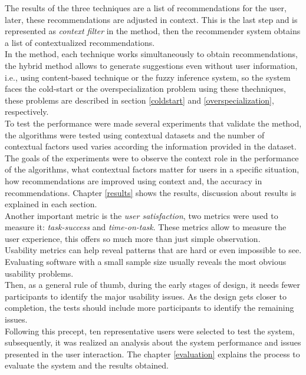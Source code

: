 The results of the three techniques are a list of recommendations for
the user, later, these recommendations are adjusted in context. This
is the last step and is represented as \textit{context filter} in the
method, then the recommender system obtains a list of contextualized
recommendations. \\
In the method, each technique works simultaneously to obtain
recommendations, the hybrid method allows to generate suggestions even
without user information, i.e., using content-based technique or the
fuzzy inference system, so the system faces the cold-start or the
overspecialization problem using these thechniques, these problems are
described in section \ref{coldstart} and 
\ref{overspecialization}, respectively.\\
To test the performance were made several experiments that validate
the method, the algorithms were tested using contextual datasets and
the number of contextual factors used varies according the information
provided in the dataset. The goals of the experiments were to observe
the context role in the performance of the algorithms, what contextual
factors matter for users in a specific situation, how recommendations
are improved using context and, the accuracy in recommendations.
Chapter \ref{results} shows the results, discussion about results is
explained in each section.\\
Another important metric is the \textit{user satisfaction}, two
metrics were used to measure it: \textit{task-success} and \textit
{time-on-task}. These metrics allow to measure the user experience,
this offers so much more than just simple observation.\\ Usability
metrics can help reveal patterns that are hard or even impossible to
see. Evaluating software with a small sample size usually reveals the
most obvious usability problems\cite{albert2013measuring}.\\ Then, as
a general rule of thumb, during the early stages of design, it needs
fewer participants to identify the major usability issues. As the
design gets closer to completion, the tests should include more
participants to identify the remaining
issues\cite{albert2013measuring}.\\ 
Following this precept, ten representative users were selected to test
the system, subsequently, it was realized an analysis about the system
performance and issues presented in the user interaction. The chapter
\ref{evaluation} explains the process to evaluate the system and the
results obtained.

